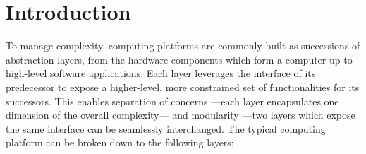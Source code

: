 \chapter{Introduction} \label{chapter:introduction}


\vspace{1cm}\noindent
%
To manage complexity, computing platforms are commonly built as successions of
abstraction layers, from the hardware components which form a computer up to
high-level software applications.
%
Each layer leverages the interface of its predecessor to expose a higher-level,
more constrained set of functionalities for its successors.
%
This enables separation of concerns ---each layer encapsulates one dimension of
the overall complexity--- and modularity ---two layers which expose the same
interface can be seamlessly interchanged.
%
The typical computing platform can be broken down to the following layers:
%
